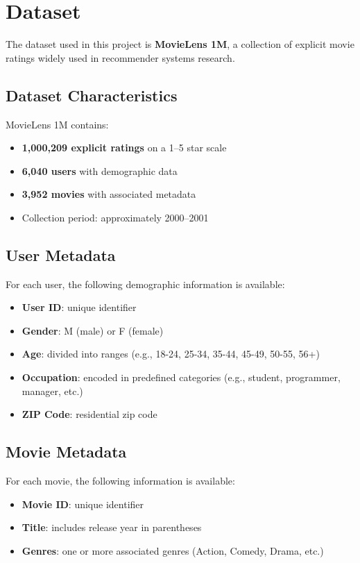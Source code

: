 \section{Dataset}

The dataset used in this project is \textbf{MovieLens 1M}, a collection of explicit movie ratings widely used in recommender systems research.

\subsection{Dataset Characteristics}

MovieLens 1M contains:
\begin{itemize}
    \item \textbf{1,000,209 explicit ratings} on a 1--5 star scale
    \item \textbf{6,040 users} with demographic data
    \item \textbf{3,952 movies} with associated metadata
    \item Collection period: approximately 2000--2001
\end{itemize}

\subsection{User Metadata}

For each user, the following demographic information is available:
\begin{itemize}
    \item \textbf{User ID}: unique identifier
    \item \textbf{Gender}: M (male) or F (female)
    \item \textbf{Age}: divided into ranges (e.g., 18-24, 25-34, 35-44, 45-49, 50-55, 56+)
    \item \textbf{Occupation}: encoded in predefined categories (e.g., student, programmer, manager, etc.)
    \item \textbf{ZIP Code}: residential zip code
\end{itemize}

\subsection{Movie Metadata}

For each movie, the following information is available:
\begin{itemize}
    \item \textbf{Movie ID}: unique identifier
    \item \textbf{Title}: includes release year in parentheses
    \item \textbf{Genres}: one or more associated genres (Action, Comedy, Drama, etc.)
\end{itemize}

